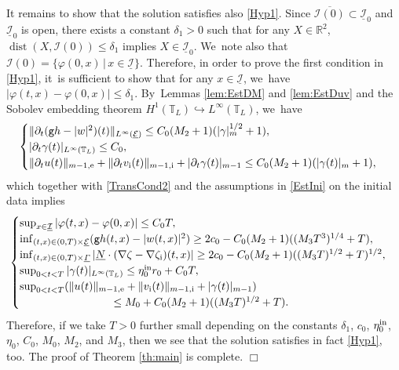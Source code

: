 \documentclass[JEP,XML,SOM,Unicode,NoFloatCountersInSection,published]{cedram}
\newcommand{\gr}{{\mathtt g}}
\newcommand{\R}{{\mathbb R}}
\newcommand{\dt}{\partial_t}
\newcommand{\cI}{{\mathcal I}}
\newcommand{\cE}{{\mathcal E}}
\newcommand{\ul}[1]{\underline{#1}}
\newcommand{\itGamma}{\mathit{\Gamma}}
\theoremstyle{definition}
\begin{document}
It remains to show that the solution satisfies also \eqref{Hyp1}.
Since $\overline{\cI(0)} \subset \ul{\cI}_0$ and $\ul{\cI}_0$ is open, there exists a constant $\delta_1>0$ such that for any $X\in\R^2$,
$\operatorname{dist}(X,\cI(0))\leq\delta_1$ implies $X\in\ul{\cI}_0$. We~note also that $\cI(0)=\{ \varphi(0,x) \,|\, x\in\ul{\cI} \}$.
Therefore, in order to prove the first condition in \eqref{Hyp1}, it~is sufficient to show that for any $x\in\ul{\cI}$, we~have $|\varphi(t,x)-\varphi(0,x)|\leq\delta_1$. By~Lemmas \ref{lem:EstDM} and \ref{lem:EstDuv} and the Sobolev embedding theorem $H^1(\mathbb{T}_L) \hookrightarrow L^\infty(\mathbb{T}_L)$, we~have
\[
\begin{cases}
\|\dt(\gr h-|w|^2)(t)\|_{L^\infty(\ul{\cE})} \leq C_0(M_2+1)(|\gamma|_m^{1/2}+1), \\
|\dt\gamma(t)|_{L^\infty(\mathbb{T}_L)} \leq C_0, \\
\|\dt u(t)\|_{m-1,{\rm e}}+\|\dt v_\mathrm{i}(t)\|_{m-1,{\rm i}}+|\dt\gamma(t)|_{m-1} \leq C_0(M_2+1)(|\gamma(t)|_m+1),
\end{cases}
\]
which together with \eqref{TransCond2} and the assumptions in \eqref{EstIni} on the initial data implies
\[
\begin{cases}
\sup_{x\in\ul{\cI}}|\varphi(t,x)-\varphi(0,x)| \leq C_0T, \\
\inf_{(t,x)\in(0,T)\times\ul{\cE}}(\gr h(t,x)-|w(t,x)|^2) \geq 2c_0 - C_0(M_2+1)((M_3T^3)^{1/4}+T), \\
\inf_{(t,x)\in(0,T)\times\ul{\itGamma}}| \ul{N}\cdot(\nabla\zeta-\nabla\zeta_\mathrm{i})(t,x)| \geq 2c_0 - C_0(M_2+1)((M_3T)^{1/2}+T)^{1/2}, \\
\sup_{0<t<T}|\gamma(t)|_{L^\infty(\mathbb{T}_L)} \leq \eta_0^{\rm in}r_0 + C_0T, \\
\sup_{0<t<T}(\|u(t)\|_{m-1,{\rm e}} + \|v_\mathrm{i}(t)\|_{m-1,{\rm i}} + |\gamma(t)|_{m-1}) \\
\hspace{3cm}\leq M_0 + C_0(M_2+1)((M_3T)^{1/2}+T).
\end{cases}
\]
Therefore, if we take $T>0$ further small depending on the constants $\delta_1$, $c_0$, $\eta_0^{\rm in}$, $\eta_0$, $C_0$, $M_0$, $M_2$, and $M_3$,
then we see that the solution satisfies in fact \eqref{Hyp1}, too.
The proof of Theorem \ref{th:main} is complete.
\hfill$\Box$

\backmatter


\end{document}
